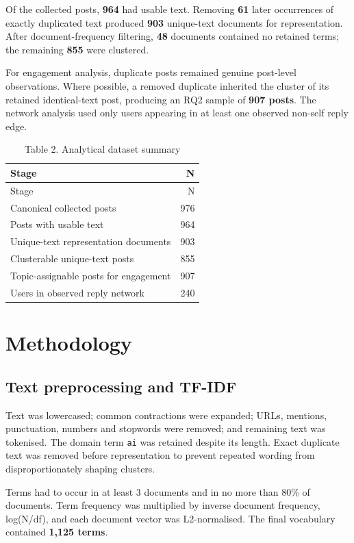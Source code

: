 \documentclass[
]{article}
\begin{document}
Of the collected posts, \textbf{964} had usable text. Removing
\textbf{61} later occurrences of exactly duplicated text produced
\textbf{903} unique-text documents for representation. After
document-frequency filtering, \textbf{48} documents contained no
retained terms; the remaining \textbf{855} were clustered.

For engagement analysis, duplicate posts remained genuine post-level
observations. Where possible, a removed duplicate inherited the cluster
of its retained identical-text post, producing an RQ2 sample of
\textbf{907 posts}. The network analysis used only users appearing in at
least one observed non-self reply edge.

\begin{longtable}[]{@{}lr@{}}
\caption{Table 2. Analytical dataset summary}\tabularnewline
\toprule\noalign{}
Stage & N \\
\midrule\noalign{}
\endfirsthead
\toprule\noalign{}
Stage & N \\
\midrule\noalign{}
\endhead
\bottomrule\noalign{}
\endlastfoot
Canonical collected posts & 976 \\
Posts with usable text & 964 \\
Unique-text representation documents & 903 \\
Clusterable unique-text posts & 855 \\
Topic-assignable posts for engagement & 907 \\
Users in observed reply network & 240 \\
\end{longtable}

\section{Methodology}\label{methodology}

\subsection{Text preprocessing and
TF-IDF}\label{text-preprocessing-and-tf-idf}

Text was lowercased; common contractions were expanded; URLs, mentions,
punctuation, numbers and stopwords were removed; and remaining text was
tokenised. The domain term \texttt{ai} was retained despite its length.
Exact duplicate text was removed before representation to prevent
repeated wording from disproportionately shaping clusters.

Terms had to occur in at least 3 documents and in no more than 80\% of
documents. Term frequency was multiplied by inverse document frequency,
log(N/df), and each document vector was L2-normalised. The final
vocabulary contained \textbf{1,125 terms}.
\end{document}
